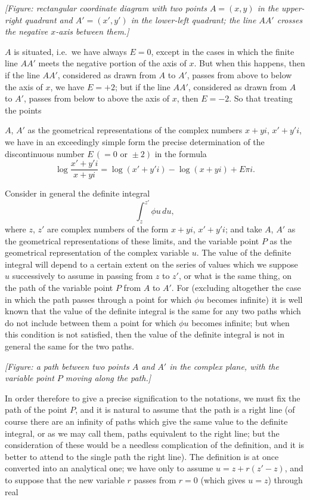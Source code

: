 \documentclass[11pt]{article}
\begin{document}
\medskip
\textit{[Figure: rectangular coordinate diagram with two points $A=(x,y)$ in the upper-right quadrant and $A'=(x',y')$ in the lower-left quadrant; the line $AA'$ crosses the negative $x$-axis between them.]}

$A$ is situated, i.e.\ we have always $E=0$, except in the cases in which the finite line $AA'$ meets the negative portion of the axis of $x$. But when this happens, then if the line $AA'$, considered as drawn from $A$ to $A'$, passes from above to below the axis of $x$, we have $E=+2$; but if the line $AA'$, considered as drawn from $A$ to $A'$, passes from below to above the axis of $x$, then $E=-2$. So that treating the points

\clearpage

$A$, $A'$ as the geometrical representations of the complex numbers $x+yi$, $x'+y'i$, we have in an exceedingly simple form the precise determination of the discontinuous number $E\,(=0\text{ or }\pm 2)$ in the formula
\[
\log\frac{x'+y'i}{x+yi}=\log(x'+y'i)-\log(x+yi)+E\pi i.
\]

Consider in general the definite integral
\[
\int_{z}^{z'}\!\phi u\,du,
\]
where $z$, $z'$ are complex numbers of the form $x+yi$, $x'+y'i$; and take $A$, $A'$ as the geometrical representations of these limits, and the variable point $P$ as the geometrical representation of the complex variable $u$. The value of the definite integral will depend to a certain extent on the series of values which we suppose $u$ successively to assume in passing from $z$ to $z'$, or what is the same thing, on the path of the variable point $P$ from $A$ to $A'$. For (excluding altogether the case in which the path passes through a point for which $\phi u$ becomes infinite) it is well known that the value of the definite integral is the same for any two paths which do not include between them a point for which $\phi u$ becomes infinite; but when this condition is not satisfied, then the value of the definite integral is not in general the same for the two paths.

\medskip
\textit{[Figure: a path between two points $A$ and $A'$ in the complex plane, with the variable point $P$ moving along the path.]}

In order therefore to give a precise signification to the notations, we must fix the path of the point $P$, and it is natural to assume that the path is a right line (of course there are an infinity of paths which give the same value to the definite integral, or as we may call them, paths equivalent to the right line; but the consideration of these would be a needless complication of the definition, and it is better to attend to the single path the right line). The definition is at once converted into an analytical one; we have only to assume $u=z+r(z'-z)$, and to suppose that the new variable $r$ passes from $r=0$ (which gives $u=z$) through real
\end{document}
